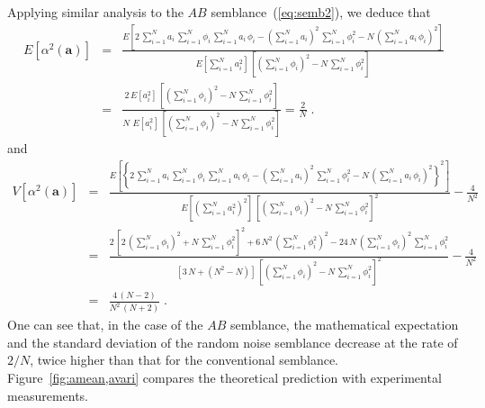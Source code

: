 Applying similar analysis to the $AB$
semblance~(\ref{eq:semb2}), we deduce that
\begin{eqnarray}
\nonumber
E\left[\alpha^2(\mathbf{a})\right] & = & \frac{\displaystyle E\left[2\,\sum_{i=1}^{N} a_i\,\sum_{i=1}^N \phi_i\,
\sum_{i=1}^N a_i\,\phi_i - \left(\sum_{i=1}^{N} a_i\right)^2\,
\sum_{i=1}^N \phi_i^2 -	 N\,\left(\sum_{i=1}^N a_i\,\phi_i\right)^2\right]}
{\displaystyle E\left[\sum_{i=1}^{N} a_i^2\right]\,
\left[\left(\sum_{i=1}^N \phi_i\right)^2 - N\,\sum_{i=1}^N \phi_i^2\right]} \\ & = &
\frac{\displaystyle 2\,E\left[a_i^2\right]\,\left[\left(\sum_{i=1}^N \phi_i\right)^2 - N\,\sum_{i=1}^N \phi_i^2\right]}
{\displaystyle N\,\,E\left[a_i^2\right]\,\left[\left(\sum_{i=1}^N \phi_i\right)^2 - N\,\sum_{i=1}^N \phi_i^2\right]}
 = \frac{2}{N}\;.
\label{eq:amean}
\end{eqnarray}
and
\begin{eqnarray}
\nonumber
V\left[\alpha^2(\mathbf{a})\right] & = & 
\frac{\displaystyle E\left[\left\{2\,\sum_{i=1}^{N} a_i\,\sum_{i=1}^N \phi_i\,
\sum_{i=1}^N a_i\,\phi_i - \left(\sum_{i=1}^{N} a_i\right)^2\,
\sum_{i=1}^N \phi_i^2 -	 N\,\left(\sum_{i=1}^N a_i\,\phi_i\right)^2\right\}^2\right]}
{\displaystyle E\left[\left(\sum_{i=1}^{N} a_i^2\right)^2\right]\,
\left[\left(\sum_{i=1}^N \phi_i\right)^2 - N\,\sum_{i=1}^N \phi_i^2\right]^2} - \frac{4}{N^2} \\ 
\nonumber
& = &
\frac{\displaystyle 2\,\left[2\,\left(\sum_{i=1}^N \phi_i\right)^2 + N\,\sum_{i=1}^N \phi_i^2\right]^2 +
6\,N^2\,\left(\sum_{i=1}^N \phi_i^2\right)^2 - 24\,N\,\left(\sum_{i=1}^N \phi_i\right)^2\,\sum_{i=1}^N \phi_i^2}
{\displaystyle \left[3\,N + (N^2-N)\right]\,\left[\left(\sum_{i=1}^N \phi_i\right)^2 - N\,\sum_{i=1}^N \phi_i^2\right]^2} - \frac{4}{N^2} \\
& = & \frac{4\,(N-2)}{N^2\,(N+2)}\;.
\label{eq:avari}
\end{eqnarray}
One can see that, in the case of the $AB$ semblance, the
mathematical expectation and the standard deviation of the random
noise semblance decrease at the rate of $2/N$, twice higher than that
for the conventional semblance. Figure~\ref{fig:amean,avari} compares
the theoretical prediction with experimental measurements.




